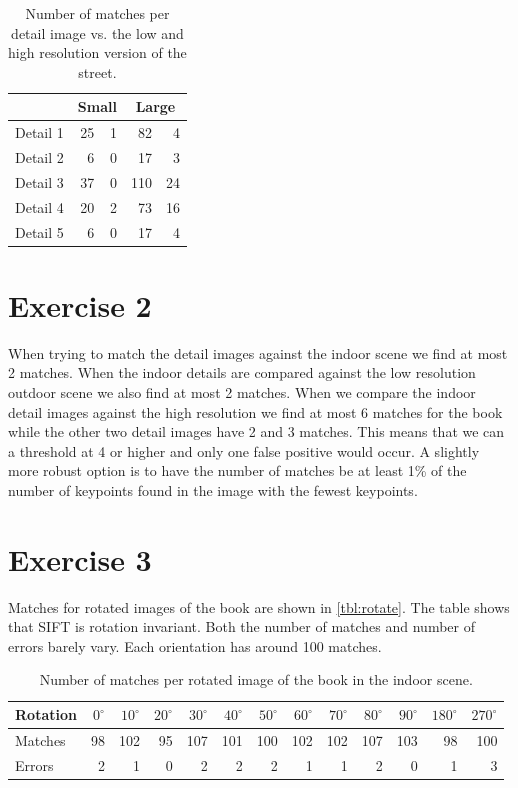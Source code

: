 \documentclass[a4paper]{article}
\begin{document}
\begin{table}[h]
	\centering
	\caption{Number of matches per detail image vs. the low and high resolution version of the street.}
	\label{tbl:street}
	\begin{tabular}{l|r|r|r|r}
		& \multicolumn{2}{c|}{Small}& \multicolumn{2}{c}{Large} \\ \hline
		Detail 1 & 25 & 1 & 82  & 4 \\
		Detail 2 &  6 & 0 & 17  & 3 \\
		Detail 3 & 37 & 0 & 110 & 24 \\
		Detail 4 & 20 & 2 & 73  & 16 \\
		Detail 5 &  6 & 0 & 17  & 4
	\end{tabular}
\end{table}

\section{Exercise 2}
When trying to match the detail images against the indoor scene we find at most 2 matches. When the indoor details are compared against the low resolution outdoor scene we also find at most 2 matches. When we compare the indoor detail images against the high resolution we find at most 6 matches for the book while the other two detail images have 2 and 3 matches. This means that we can a threshold at 4 or higher and only one false positive would occur. A slightly more robust option is to have the number of matches be at least 1\% of the number of keypoints found in the image with the fewest keypoints.

\section{Exercise 3}
Matches for rotated images of the book are shown in \autoref{tbl:rotate}. The table shows that SIFT is rotation invariant. Both the number of matches and number of errors barely vary. Each orientation has around 100 matches.

\begin{table}[h]
	\centering
	\caption{Number of matches per rotated image of the book in the indoor scene.}
	\label{tbl:rotate}
	\begin{tabular}{l|r|r|r|r|r|r|r|r|r|r|r|r}
		Rotation & $0^\circ$ & $10^\circ$ & $20^\circ$ & $30^\circ$ & $40^\circ$ & $50^\circ$ & $60^\circ$ & $70^\circ$ & $80^\circ$ & $90^\circ$ & $180^\circ$ & $270^\circ$ \\ \hline
		Matches & 98 & 102 & 95 & 107 & 101 & 100 & 102 & 102 & 107 & 103 & 98 & 100 \\
		Errors  &  2 &   1 &  0 &   2 &   2 &   2 &   1 &   1 &   2 &   0 &  1 & 3 \\
	\end{tabular}
\end{table}
\end{document}
